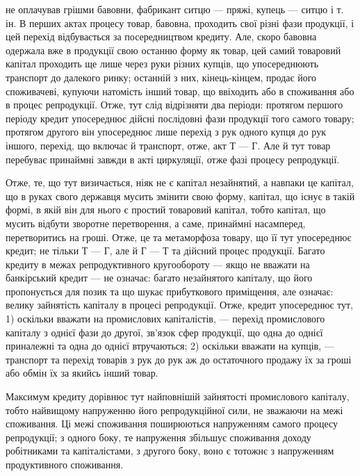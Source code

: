 \parcont{}  %
не оплачував грішми бавовни, фабрикант ситцю — пряжі, купець — ситцю і т. ін.
В перших актах процесу товар, бавовна, проходить свої різні фази продукції, і цей
перехід відбувається за посередництвом кредиту. Але, скоро бавовна одержала
вже в продукції свою останню форму як товар, цей самий товаровий капітал
проходить ще лише через руки різних купців, що упосереднюють транспорт до
далекого ринку; останній з них, кінець-кінцем, продає його споживачеві,
купуючи натомість інший товар, що ввіходить або в споживання або в процес
репродукції. Отже, тут слід відрізняти два періоди: протягом першого періоду
кредит упосереднює дійсні послідовні фази продукції того самого товару; протягом
другого він упосереднює лише перехід з рук одного купця до рук іншого, перехід,
що включає й транспорт, отже, акт Т — Г. Але й тут товар перебуває принаймні
завжди в акті циркуляції, отже фазі процесу репродукції.

Отже, те, що тут визичається, ніяк не є капітал незайнятий, а навпаки це
капітал, що в руках свого державця мусить змінити свою форму, капітал, що
існує в такій формі, в якій він для нього є простий товаровий капітал, тобто
капітал, що мусить відбути зворотне перетворення, а саме, принаймні насамперед,
перетворитись на гроші. Отже, це та метаморфоза товару, що її тут упосереднює
кредит; не тільки Т — Г, але й Г — Т та дійсний процес продукції.
Багато кредиту в межах репродуктивного кругообороту — якщо не вважати на банкірський
кредит — не означає: багато незайнятого капіталу, що його пропонується
для позик та що шукає прибуткового приміщення, але означає: велику
зайнятість капіталу в процесі репродукції. Отже, кредит упосереднює тут,
1) оскільки вважати на промислових капіталістів, — перехід промислового капіталу
з однієї фази до другої, зв’язок сфер продукції, що одна до однієї приналежні
та одна до однієї втручаються; 2) оскільки вважати на купців, —
транспорт та перехід товарів з рук до рук аж до остаточного продажу їх за
гроші або обмін їх за якийсь інший товар.

Максимум кредиту дорівнює тут найповнішій зайнятості промислового капіталу,
тобто найвищому напруженню його репродукційної сили, не зважаючи на межі
споживання. Ці межі споживання поширюються напруженням самого процесу
репродукції; з одного боку, те напруження збільшує споживання доходу робітниками
та капіталістами, з другого боку, воно є тотожнє з напруженням продуктивного
споживання.

